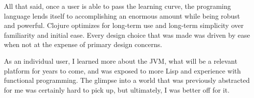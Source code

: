     All that said, once a user is able to pass the learning curve, the programing language lends itself to accomplishing an enormous amount while being robust and powerful. Clojure optimizes for long-term use and long-term simplicity over familiarity and initial ease. Every design choice that was made was driven by ease when not at the expense of primary design concerns.
    
    As an individual user, I learned more about the JVM, what will be a relevant platform for years to come, and was exposed to more Lisp and experience with functional programming. The glimpse into a world that was previously abstracted for me was certainly hard to pick up, but ultimately, I was better off for it.
